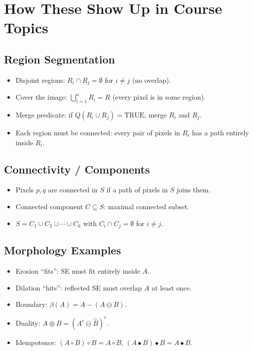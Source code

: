 \documentclass[11pt]{article}
\begin{document}
\section{How These Show Up in Course Topics}

\subsection{Region Segmentation}
\begin{itemize}
\item Disjoint regions: $R_i \cap R_j = \emptyset$ for $i \ne j$ (no overlap).
\item Cover the image: $\bigcup_{i=1}^{n} R_i = R$ (every pixel is in some region).
\item Merge predicate: if $Q(R_i \cup R_j) = \text{TRUE}$, merge $R_i$ and $R_j$.
\item Each region must be connected: every pair of pixels in $R_i$ has a path entirely inside $R_i$.
\end{itemize}

\subsection{Connectivity / Components}
\begin{itemize}
\item Pixels $p, q$ are connected in $S$ if a path of pixels in $S$ joins them.
\item Connected component $C \subseteq S$: maximal connected subset.
\item $S = C_1 \cup C_2 \cup \cdots \cup C_k$ with $C_i \cap C_j = \emptyset$ for $i \ne j$.
\end{itemize}

\subsection{Morphology Examples}
\begin{itemize}
\item Erosion ``fits'': SE must fit entirely inside $A$.
\item Dilation ``hits'': reflected SE must overlap $A$ at least once.
\item Boundary: $\beta(A) = A - (A \ominus B)$.
\item Duality: $A \oplus B = (A^c \ominus \hat{B})^c$.
\item Idempotence: $(A \circ B) \circ B = A \circ B$, $(A \bullet B) \bullet B = A \bullet B$.
\end{itemize}
\end{document}
